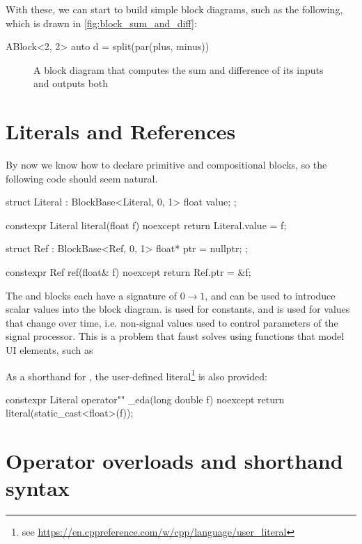 With these, we can start to build simple block diagrams, such as the following, which is drawn in
\autoref{fig:block_sum_and_diff}:

\begin{cppcodenl}
  ABlock<2, 2> auto d = split(par(plus, minus))
\end{cppcodenl}

\begin{figure}
  \centering
  
  \caption{A block diagram that computes the sum and difference of its inputs and outputs both}
  \label{fig:block_sum_and_diff}
\end{figure}

\section{Literals and References}
\label{sec:eda_lit_and_ref}

By now we know how to declare primitive and compositional blocks, so the following code should seem natural.
\begin{cppcodenl}
  struct Literal : BlockBase<Literal, 0, 1> {
    float value;
  };

  constexpr Literal literal(float f) noexcept {
    return Literal{.value = f};
  }

  struct Ref : BlockBase<Ref, 0, 1> {
    float* ptr = nullptr;
  };

  constexpr Ref ref(float& f) noexcept
  {
    return Ref{.ptr = &f};
  }
\end{cppcodenl}

The  and  blocks each have a signature of $0 \rightarrow 1$, and can be used to
introduce scalar values into the block diagram.  is used for constants, and  is used for values that change
over time, i.e. non-signal values used to control parameters of the signal processor. This is a problem that
faust solves using functions that model UI elements, such as \autocite{orlarey2004}

As a shorthand for , the user-defined literal\footnote{see \url{https://en.cppreference.com/w/cpp/language/user_literal}}  is also
provided:
\begin{cppcodenl}
  constexpr Literal operator"" _eda(long double f) noexcept
  {
    return literal(static_cast<float>(f));
  }
\end{cppcodenl}

\section{Operator overloads and shorthand syntax}

